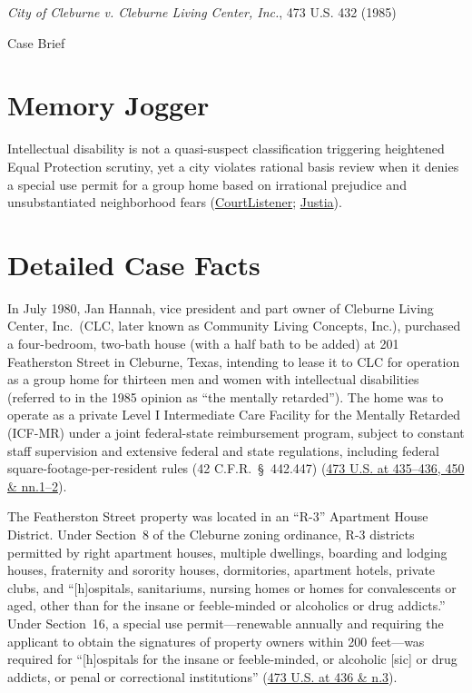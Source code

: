 \documentclass[12pt]{article}
\begin{document}
\begin{center}
{\LARGE \textit{City of Cleburne v. Cleburne Living Center, Inc.}, 473 U.S. 432 (1985)\par}
\vspace{0.8em}
{\large Case Brief\par}
\end{center}
\vspace{1em}

\section{Memory Jogger}

Intellectual disability is not a quasi-suspect classification triggering heightened Equal Protection scrutiny, yet a city violates rational basis review when it denies a special use permit for a group home based on irrational prejudice and unsubstantiated neighborhood fears (\href{https://www.courtlistener.com/opinion/111507/city-of-cleburne-v-cleburne-living-center-inc/}{CourtListener}; \href{https://supreme.justia.com/cases/federal/us/473/432/}{Justia}).

\section{Detailed Case Facts}

In July 1980, Jan Hannah, vice president and part owner of Cleburne Living Center, Inc.\ (CLC, later known as Community Living Concepts, Inc.), purchased a four-bedroom, two-bath house (with a half bath to be added) at 201 Featherston Street in Cleburne, Texas, intending to lease it to CLC for operation as a group home for thirteen men and women with intellectual disabilities (referred to in the 1985 opinion as ``the mentally retarded''). The home was to operate as a private Level I Intermediate Care Facility for the Mentally Retarded (ICF-MR) under a joint federal-state reimbursement program, subject to constant staff supervision and extensive federal and state regulations, including federal square-footage-per-resident rules (42 C.F.R.\ \S~442.447) (\href{https://supreme.justia.com/cases/federal/us/473/432/}{473 U.S. at 435--436, 450 \& nn.1--2}).

The Featherston Street property was located in an ``R-3'' Apartment House District. Under Section~8 of the Cleburne zoning ordinance, R-3 districts permitted by right apartment houses, multiple dwellings, boarding and lodging houses, fraternity and sorority houses, dormitories, apartment hotels, private clubs, and ``[h]ospitals, sanitariums, nursing homes or homes for convalescents or aged, other than for the insane or feeble-minded or alcoholics or drug addicts.'' Under Section~16, a special use permit---renewable annually and requiring the applicant to obtain the signatures of property owners within 200 feet---was required for ``[h]ospitals for the insane or feeble-minded, or alcoholic [sic] or drug addicts, or penal or correctional institutions'' (\href{https://supreme.justia.com/cases/federal/us/473/432/}{473 U.S. at 436 \& n.3}).
\end{document}
